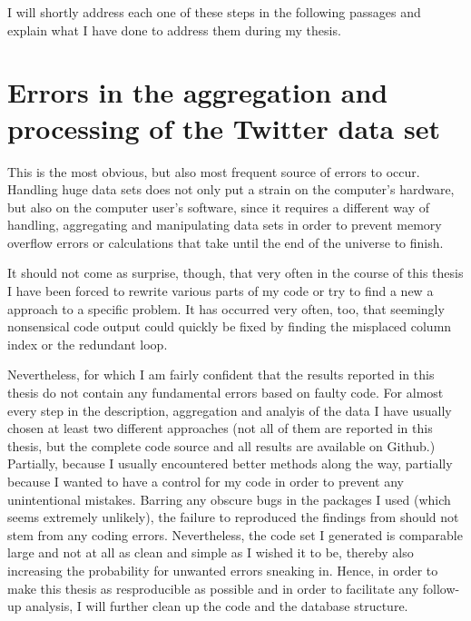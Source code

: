 \documentclass[11pt, a4paper,twoside]{report}\usepackage[]{graphicx}\usepackage[]{color}
\begin{document}
I will shortly address each one of these steps in the following passages and explain what I have done to address them during my thesis. 

\section{Errors in the aggregation and processing of the Twitter data set}
This is the most obvious, but also most frequent source of errors to occur. Handling huge data sets does not only put a strain on the computer's hardware, but also on the computer user's software, since it requires a different way of handling, aggregating and manipulating data sets in order to prevent memory overflow errors or calculations that take until the end of the universe to finish.

It should not come as surprise, though, that very often in the course of this thesis I have been forced to rewrite various parts of my code or try to find a new a approach to a specific problem. It has occurred very often, too, that seemingly nonsensical code output could quickly be fixed by finding the misplaced column index or the redundant loop.

Nevertheless, for which I am fairly confident that the results reported in this thesis do not contain any fundamental errors based on faulty code. For almost every step in the description, aggregation and analyis of the data I have usually chosen at least two different approaches (not all of them are reported in this thesis, but the complete code source and all results are available on Github.) Partially, because I usually encountered better methods along the way, partially because I wanted to have a control for my code in order to prevent any unintentional mistakes. Barring any obscure bugs in the packages I used (which seems extremely unlikely), the failure to reproduced the findings from \citep{bodnar_data_2015} should not stem from any coding errors. Nevertheless, the code set I generated is comparable large and not at all as clean and simple as I wished it to be, thereby also increasing the probability for unwanted errors sneaking in. Hence, in order to make this thesis as resproducible as possible and in order to facilitate any follow-up analysis, I will further clean up the code and the database structure.
\end{document}
